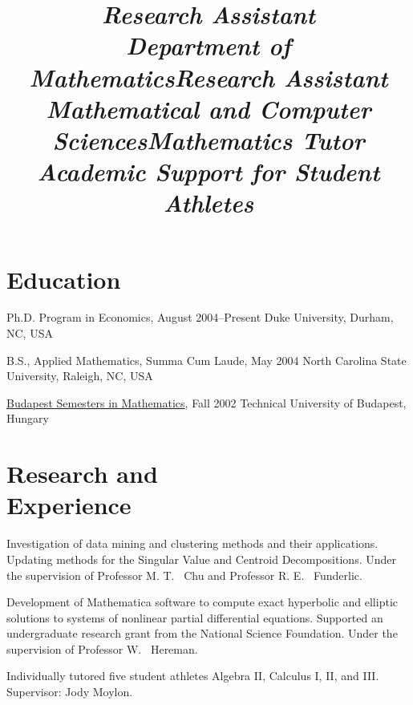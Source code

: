 \documentclass[margin,line,11pt,final]{res}
\begin{document}
\begin{resume}

\section{\sc Education}
Ph.D. Program in Economics, August 2004--Present \newline
Duke University, Durham, NC, USA

B.S., Applied Mathematics, Summa Cum Laude, May 2004 \newline
North Carolina State University, Raleigh, NC, USA

\href{http://www.stolaf.edu/depts/math/budapest/}
{Budapest Semesters in Mathematics}, Fall 2002 \newline
Technical University of Budapest, Hungary


\section{\sc Research and \\Experience}

\title{\em Research Assistant \\ Department of Mathematics}
\location{}
\begin{position}
Investigation of data mining and clustering methods and their
applications. Updating methods for the Singular Value and Centroid
Decompositions. Under the supervision of Professor M. T. \ Chu and
Professor R. E. \ Funderlic.
\end{position}

\title{\em Research Assistant \\ Mathematical and Computer Sciences}
\location{}
\begin{position}
Development of Mathematica software to compute exact hyperbolic and
elliptic solutions to systems of nonlinear partial differential
equations. Supported an undergraduate research grant from the National
Science Foundation.  Under the supervision of Professor W. \ Hereman.
\end{position}

\title{\em Mathematics Tutor \\ Academic Support for Student Athletes}
\location{}
\begin{position}
Individually tutored five student athletes Algebra II, Calculus I, II,
and III. Supervisor: Jody Moylon.
\end{position}


\end{resume}
\end{document}
